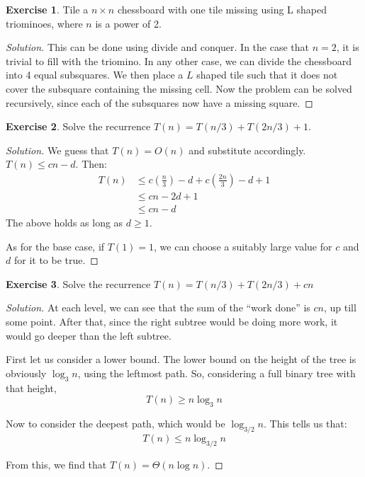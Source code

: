 \documentclass[12pt,letterpaper]{article}
\theoremstyle{definition}
\newtheorem*{exercise}{Exercise}
\newenvironment{solution}
  {\renewcommand\qedsymbol{$\blacksquare$}\begin{proof}[Solution]}
  {\end{proof}}
\begin{document}
\begin{exercise}
  Tile a $n \times n$ chessboard with one tile missing using L shaped triominoes, where $n$ is a power of 2.
\end{exercise}
\begin{solution}
  This can be done using divide and conquer. In the case that $n = 2$, it is trivial to fill with the triomino.
  In any other case, we can divide the chessboard into 4 equal subsquares. We then place a $L$ shaped tile such that it does not cover the subsquare containing the missing cell. Now the problem can be solved recursively, since each of the subsquares now have a missing square.
\end{solution}

\begin{exercise}
  Solve the recurrence $T(n) = T(n/3) + T(2n/3) + 1$.
\end{exercise}
\begin{solution}
  We guess that $T(n) = O(n)$ and substitute accordingly. $T(n) \leq cn-d$. Then:
  \begin{align*}
    T(n) & \leq c(\frac{n}{3}) - d + c(\frac{2n}{3})  - d + 1 \\
         &\leq cn -2d + 1 \\
         &\leq cn-d
  \end{align*}
  The above holds as long as $d \geq 1$.

  As for the base case, if $T(1) = 1$, we can choose a suitably large value for $c$ and $d$ for it to be true.
\end{solution}

\begin{exercise}
  Solve the recurrence $T(n) = T(n/3) + T(2n/3) + cn$
\end{exercise}
\begin{solution}
  At each level, we can see that the sum of the ``work done''  is $cn$, up till some point. After that, since the right subtree would be doing more work, it would go deeper than the left subtree.

  First let us consider a lower bound. The lower bound on the height of the tree is obviously $\log_3n$, using the leftmost path. So, considering a full binary tree with that height,
  \[T(n) \geq n \log_3n\]

  Now to consider the deepest path, which would be $\log_{3/2}n$. This tells us that:
  \[T(n) \leq n \log_{3/2}n\]

  From this, we find that $T(n) = \Theta(n \log n)$.
\end{solution}
\end{document}
